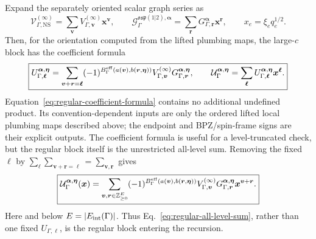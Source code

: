 \documentclass[11pt]{article}
\newcommand{\NS}{\mathrm{NS}}
\newcommand{\osp}{\mathfrak{osp}(1|2)}
\newcommand{\G}{\mathcal G}
\newcommand{\V}{\mathcal V}
\newcommand{\U}{\mathcal U}
\begin{document}
Expand the separately oriented scalar graph series as
\begin{equation}
 \V_{\Gamma,\NS}^{(\infty)}
 =\sum_{\bm v}V_{\Gamma,\bm v}^{(\infty)}\bm x^{\bm v},
 \qquad
 \G_{\Gamma}^{\osp,\bm\alpha}
 =\sum_{\bm r}G_{\Gamma,\bm r}^{\bm\alpha}\bm x^{\bm r},
 \qquad x_e=\xi_e q_e^{1/2}.
 \label{eq:regular-factor-series}
\end{equation}
Then, for the orientation computed from the lifted plumbing maps, the
large-\(c\) block has the
coefficient formula
\begin{equation}
\boxed{
 U_{\Gamma,\bm\ell}^{\bm\alpha,\bm\eta}
 =\sum_{\bm v+\bm r=\bm\ell}
 (-1)^{B_\Gamma^{\rm eff}(a(\bm v),b(\bm r,\bm\eta))}
 V_{\Gamma,\bm v}^{(\infty)}
 G_{\Gamma,\bm r}^{\bm\alpha,\bm\eta},
 \qquad
 \U_\Gamma^{\bm\alpha,\bm\eta}
 =\sum_{\bm\ell}U_{\Gamma,\bm\ell}^{\bm\alpha,\bm\eta}
  \bm x^{\bm\ell}.}
 \label{eq:regular-coefficient-formula}
\end{equation}
Equation~\eqref{eq:regular-coefficient-formula} contains no additional
undefined product.  Its convention-dependent inputs are only the ordered
lifted local plumbing maps described above; the endpoint and BPZ/spin-frame
signs are their explicit outputs.
The coefficient formula is useful for a level-truncated check, but the
regular block itself is the unrestricted all-level sum.  Removing the fixed
\(\bm\ell\) by
\(\sum_{\bm\ell}\sum_{\bm v+\bm r=\bm\ell}
 =\sum_{\bm v,\bm r}\) gives
\begin{equation}
\boxed{
 \U_\Gamma^{\bm\alpha,\bm\eta}(\bm x)
 =\sum_{\bm v,\bm r\in\mathbb Z_{\ge0}^{E}}
 (-1)^{B_\Gamma^{\rm eff}(a(\bm v),b(\bm r,\bm\eta))}
 V_{\Gamma,\bm v}^{(\infty)}
 G_{\Gamma,\bm r}^{\bm\alpha,\bm\eta}
 \bm x^{\bm v+\bm r}.}
 \label{eq:regular-all-level-sum}
\end{equation}
Here and below \(E=|E_{\rm int}(\Gamma)|\).  Thus
Eq.~\eqref{eq:regular-all-level-sum}, rather than one fixed
\(U_{\Gamma,\bm\ell}\), is the regular block entering the recursion.
\end{document}
